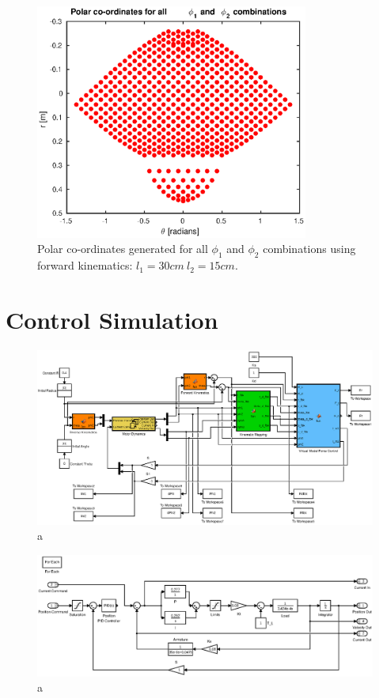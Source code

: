 \begin{figure}
\centering
\includegraphics[width=0.8\textwidth]{images/geometry/forward-kinematic-leg-positions-30-15-complex.eps}
\caption{Polar co-ordinates generated for all $\phi_1$ and $\phi_2$ combinations using forward kinematics: $l_1 = 30cm\ l_2 = 15cm$.}
\label{fig:Polar co-ordinates generated 30-15}
\end{figure}

\section{Control Simulation}

\begin{figure}
\centering
\includegraphics[width=1\textwidth]{images/simulation/leg-simulation.eps}
\caption{a}
\label{fig:a}
\end{figure}

\begin{figure}
\centering
\includegraphics[width=1\textwidth]{images/simulation/motor-model.eps}
\caption{a}
\label{fig:a}
\end{figure}

